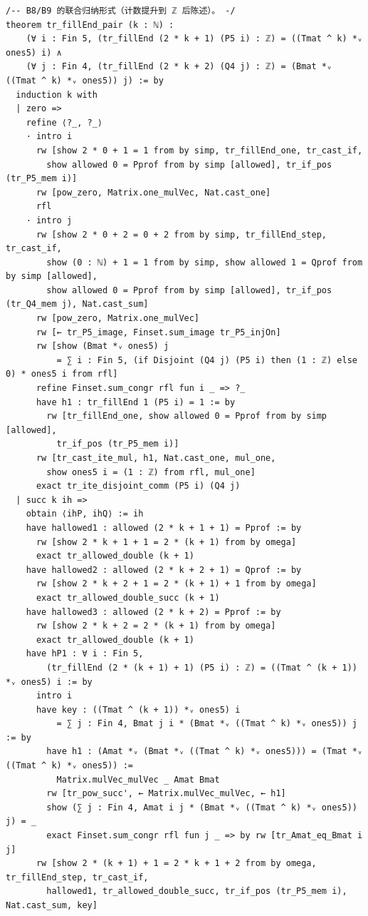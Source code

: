\documentclass[11pt]{article}
\begin{document}
\begin{lstlisting}
/-- B8/B9 的联合归纳形式（计数提升到 ℤ 后陈述）。 -/
theorem tr_fillEnd_pair (k : ℕ) :
    (∀ i : Fin 5, (tr_fillEnd (2 * k + 1) (P5 i) : ℤ) = ((Tmat ^ k) *ᵥ ones5) i) ∧
    (∀ j : Fin 4, (tr_fillEnd (2 * k + 2) (Q4 j) : ℤ) = (Bmat *ᵥ ((Tmat ^ k) *ᵥ ones5)) j) := by
  induction k with
  | zero =>
    refine ⟨?_, ?_⟩
    · intro i
      rw [show 2 * 0 + 1 = 1 from by simp, tr_fillEnd_one, tr_cast_if,
        show allowed 0 = Pprof from by simp [allowed], tr_if_pos (tr_P5_mem i)]
      rw [pow_zero, Matrix.one_mulVec, Nat.cast_one]
      rfl
    · intro j
      rw [show 2 * 0 + 2 = 0 + 2 from by simp, tr_fillEnd_step, tr_cast_if,
        show (0 : ℕ) + 1 = 1 from by simp, show allowed 1 = Qprof from by simp [allowed],
        show allowed 0 = Pprof from by simp [allowed], tr_if_pos (tr_Q4_mem j), Nat.cast_sum]
      rw [pow_zero, Matrix.one_mulVec]
      rw [← tr_P5_image, Finset.sum_image tr_P5_injOn]
      rw [show (Bmat *ᵥ ones5) j
          = ∑ i : Fin 5, (if Disjoint (Q4 j) (P5 i) then (1 : ℤ) else 0) * ones5 i from rfl]
      refine Finset.sum_congr rfl fun i _ => ?_
      have h1 : tr_fillEnd 1 (P5 i) = 1 := by
        rw [tr_fillEnd_one, show allowed 0 = Pprof from by simp [allowed],
          tr_if_pos (tr_P5_mem i)]
      rw [tr_cast_ite_mul, h1, Nat.cast_one, mul_one,
        show ones5 i = (1 : ℤ) from rfl, mul_one]
      exact tr_ite_disjoint_comm (P5 i) (Q4 j)
  | succ k ih =>
    obtain ⟨ihP, ihQ⟩ := ih
    have hallowed1 : allowed (2 * k + 1 + 1) = Pprof := by
      rw [show 2 * k + 1 + 1 = 2 * (k + 1) from by omega]
      exact tr_allowed_double (k + 1)
    have hallowed2 : allowed (2 * k + 2 + 1) = Qprof := by
      rw [show 2 * k + 2 + 1 = 2 * (k + 1) + 1 from by omega]
      exact tr_allowed_double_succ (k + 1)
    have hallowed3 : allowed (2 * k + 2) = Pprof := by
      rw [show 2 * k + 2 = 2 * (k + 1) from by omega]
      exact tr_allowed_double (k + 1)
    have hP1 : ∀ i : Fin 5,
        (tr_fillEnd (2 * (k + 1) + 1) (P5 i) : ℤ) = ((Tmat ^ (k + 1)) *ᵥ ones5) i := by
      intro i
      have key : ((Tmat ^ (k + 1)) *ᵥ ones5) i
          = ∑ j : Fin 4, Bmat j i * (Bmat *ᵥ ((Tmat ^ k) *ᵥ ones5)) j := by
        have h1 : (Amat *ᵥ (Bmat *ᵥ ((Tmat ^ k) *ᵥ ones5))) = (Tmat *ᵥ ((Tmat ^ k) *ᵥ ones5)) :=
          Matrix.mulVec_mulVec _ Amat Bmat
        rw [tr_pow_succ', ← Matrix.mulVec_mulVec, ← h1]
        show (∑ j : Fin 4, Amat i j * (Bmat *ᵥ ((Tmat ^ k) *ᵥ ones5)) j) = _
        exact Finset.sum_congr rfl fun j _ => by rw [tr_Amat_eq_Bmat i j]
      rw [show 2 * (k + 1) + 1 = 2 * k + 1 + 2 from by omega, tr_fillEnd_step, tr_cast_if,
        hallowed1, tr_allowed_double_succ, tr_if_pos (tr_P5_mem i), Nat.cast_sum, key]

\end{lstlisting}
\end{document}
